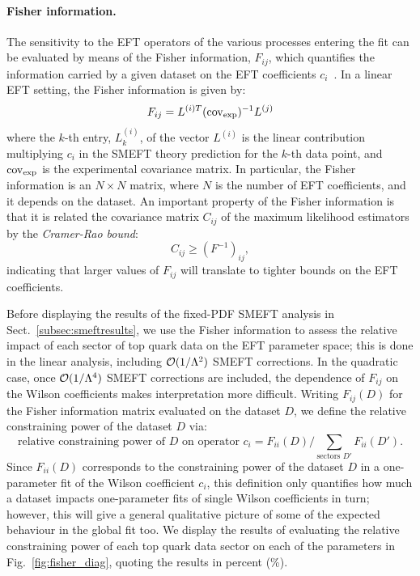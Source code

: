 \documentclass[withindex,glossary]{cam-thesis}
\begin{document}
\paragraph{Fisher information.}
The sensitivity to the EFT operators of the various processes entering
the fit can be evaluated by means of the Fisher information, $F_{ij}$, which
quantifies the information carried by a given dataset on the EFT coefficients $c_i$~\cite{Brehmer:2016nyr}. 
In a linear EFT setting,
the Fisher information is given by:
\begin{equation}
\label{eq:fisherdef}
F_{ij} = L^{(i)T} ({\rm cov}_{\rm exp})^{-1} L^{(j)}
\end{equation}
where the $k$-th entry, $L^{(i)}_k$, of the vector $L^{(i)}$ is the
linear contribution multiplying $c_i$ in the SMEFT theory prediction
for the $k$-th data point, and ${\rm cov}_{\rm exp}$ is the
experimental covariance matrix. In particular, the Fisher information
is an $N \times N$ matrix, where $N$ is the number of EFT
coefficients, and it depends on the dataset. 
An important property of the Fisher information is that it is related the covariance matrix $C_{ij}$ of the maximum likelihood estimators by the \textit{Cramer-Rao bound}:
\begin{equation}
\label{eq:cramerrao}
C_{ij} \geq (F^{-1})_{ij},
\end{equation}
indicating that larger values of $F_{ij}$ will translate to tighter bounds on the
EFT coefficients.

Before displaying the results of the fixed-PDF SMEFT analysis in
Sect.~\ref{subsec:smeftresults}, we use the Fisher information 
to assess the relative impact of each sector of top quark data on the
EFT parameter space; this is done in the linear analysis, including
${\cal O}(1/\Lambda^2)$ SMEFT corrections.  
In the quadratic case, once ${\cal O}(1/\Lambda^4)$ SMEFT corrections
are included, the dependence of $F_{ij}$ on the Wilson coefficients makes interpretation more difficult.
Writing $F_{ij}(D)$ for the
Fisher information matrix evaluated on the dataset $D$, we define the relative constraining power of the dataset $D$
via:
\begin{equation}
\label{eq:relativeconstrainingpower}
	\textrm{relative constraining power of }D\textrm{ on operator }c_i = F_{ii}(D) \bigg/ \displaystyle \sum_{\text{sectors }D'} F_{ii}(D').
\end{equation}
%
Since $F_{ii}(D)$ corresponds to the constraining power of the dataset $D$ in a one-parameter fit of the Wilson coefficient $c_i$,
this definition only quantifies how much a dataset impacts one-parameter fits of single Wilson coefficients in turn; however, this will give 
a general qualitative picture of some of the expected behaviour in the global fit too. 
We display the results of evaluating the relative constraining power of each top quark data sector on each of the
parameters in Fig.~\ref{fig:fisher_diag}, quoting the results in percent (\%).
\end{document}
